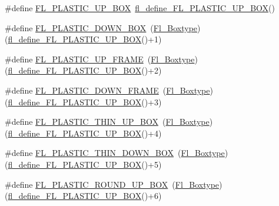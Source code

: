 \begin{DoxyCompactItemize}
\item 
\#define \hyperlink{_enumerations_8_h_a8712c687538f7d4966c0461c3d913b5f}{F\+L\+\_\+\+P\+L\+A\+S\+T\+I\+C\+\_\+\+U\+P\+\_\+\+B\+OX}~\hyperlink{_enumerations_8_h_a5789d998f2b5e51e11e386fcbbe7bbb2}{fl\+\_\+define\+\_\+\+F\+L\+\_\+\+P\+L\+A\+S\+T\+I\+C\+\_\+\+U\+P\+\_\+\+B\+OX}()
\item 
\#define \hyperlink{_enumerations_8_h_a07239e54973afe65305b4d72f9546ad6}{F\+L\+\_\+\+P\+L\+A\+S\+T\+I\+C\+\_\+\+D\+O\+W\+N\+\_\+\+B\+OX}~(\hyperlink{_enumerations_8_h_ae48bf9070f8541de17829f54ccacc6bc}{Fl\+\_\+\+Boxtype})(\hyperlink{_enumerations_8_h_a5789d998f2b5e51e11e386fcbbe7bbb2}{fl\+\_\+define\+\_\+\+F\+L\+\_\+\+P\+L\+A\+S\+T\+I\+C\+\_\+\+U\+P\+\_\+\+B\+OX}()+1)
\item 
\#define \hyperlink{_enumerations_8_h_a1deb4a0b0cdff790242a812f137c61e0}{F\+L\+\_\+\+P\+L\+A\+S\+T\+I\+C\+\_\+\+U\+P\+\_\+\+F\+R\+A\+ME}~(\hyperlink{_enumerations_8_h_ae48bf9070f8541de17829f54ccacc6bc}{Fl\+\_\+\+Boxtype})(\hyperlink{_enumerations_8_h_a5789d998f2b5e51e11e386fcbbe7bbb2}{fl\+\_\+define\+\_\+\+F\+L\+\_\+\+P\+L\+A\+S\+T\+I\+C\+\_\+\+U\+P\+\_\+\+B\+OX}()+2)
\item 
\#define \hyperlink{_enumerations_8_h_a7c5319d276f2b9393f25b528c7f4e42e}{F\+L\+\_\+\+P\+L\+A\+S\+T\+I\+C\+\_\+\+D\+O\+W\+N\+\_\+\+F\+R\+A\+ME}~(\hyperlink{_enumerations_8_h_ae48bf9070f8541de17829f54ccacc6bc}{Fl\+\_\+\+Boxtype})(\hyperlink{_enumerations_8_h_a5789d998f2b5e51e11e386fcbbe7bbb2}{fl\+\_\+define\+\_\+\+F\+L\+\_\+\+P\+L\+A\+S\+T\+I\+C\+\_\+\+U\+P\+\_\+\+B\+OX}()+3)
\item 
\#define \hyperlink{_enumerations_8_h_a3650aaf6d19724ef602101edf534268a}{F\+L\+\_\+\+P\+L\+A\+S\+T\+I\+C\+\_\+\+T\+H\+I\+N\+\_\+\+U\+P\+\_\+\+B\+OX}~(\hyperlink{_enumerations_8_h_ae48bf9070f8541de17829f54ccacc6bc}{Fl\+\_\+\+Boxtype})(\hyperlink{_enumerations_8_h_a5789d998f2b5e51e11e386fcbbe7bbb2}{fl\+\_\+define\+\_\+\+F\+L\+\_\+\+P\+L\+A\+S\+T\+I\+C\+\_\+\+U\+P\+\_\+\+B\+OX}()+4)
\item 
\#define \hyperlink{_enumerations_8_h_a29922eec41811761eda1670cc44ca569}{F\+L\+\_\+\+P\+L\+A\+S\+T\+I\+C\+\_\+\+T\+H\+I\+N\+\_\+\+D\+O\+W\+N\+\_\+\+B\+OX}~(\hyperlink{_enumerations_8_h_ae48bf9070f8541de17829f54ccacc6bc}{Fl\+\_\+\+Boxtype})(\hyperlink{_enumerations_8_h_a5789d998f2b5e51e11e386fcbbe7bbb2}{fl\+\_\+define\+\_\+\+F\+L\+\_\+\+P\+L\+A\+S\+T\+I\+C\+\_\+\+U\+P\+\_\+\+B\+OX}()+5)
\item 
\#define \hyperlink{_enumerations_8_h_ad86ffc9d6fa9cc818a1e424c95e12d37}{F\+L\+\_\+\+P\+L\+A\+S\+T\+I\+C\+\_\+\+R\+O\+U\+N\+D\+\_\+\+U\+P\+\_\+\+B\+OX}~(\hyperlink{_enumerations_8_h_ae48bf9070f8541de17829f54ccacc6bc}{Fl\+\_\+\+Boxtype})(\hyperlink{_enumerations_8_h_a5789d998f2b5e51e11e386fcbbe7bbb2}{fl\+\_\+define\+\_\+\+F\+L\+\_\+\+P\+L\+A\+S\+T\+I\+C\+\_\+\+U\+P\+\_\+\+B\+OX}()+6)

\end{DoxyCompactItemize}
